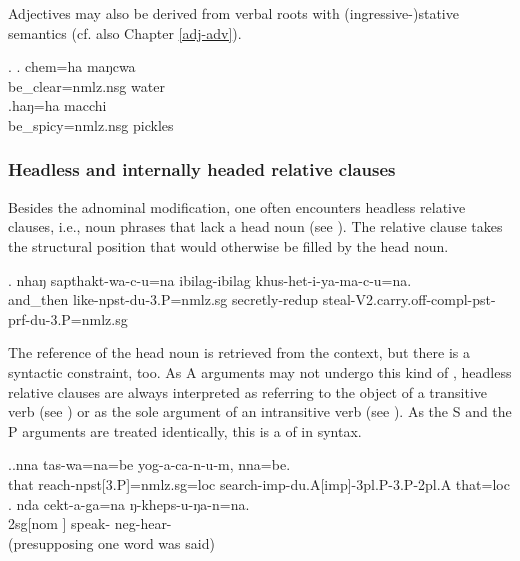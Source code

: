 Adjectives may also be derived from verbal roots with (ingressive-)stative semantics \Next (cf. also Chapter \ref{adj-adv}).


	  \ex. \ag.  chem=ha maŋcwa\\
	be\_clear{\sc =nmlz.nsg}  water\\
	\bg.haŋ=ha macchi\\
	be\_spicy{\sc =nmlz.nsg}	pickles\\

	
 

\subsubsection{Headless and internally headed relative clauses}\label{internally-headed-rc}
	
Besides the adnominal modification, one often encounters headless relative clauses, i.e., noun phrases that lack a head noun (see \Next). The relative clause takes the structural position that would otherwise be filled by the head noun.

\exg.  nhaŋ   sapthakt-wa-c-u=na                ibilag-ibilag       khus-het-i-ya-ma-c-u=na.\\
 and\_then like{\sc -npst-du-3.P=nmlz.sg} secretly-{\sc redup} steal{\sc -V2.carry.off-compl-pst-prf-du-3.P=nmlz.sg}\\
 


The reference of the head noun is retrieved from the context, but there is a syntactic constraint, too.
As A arguments may not undergo this kind of , headless relative clauses are always interpreted as referring to the object of a transitive verb (see \Next[a]) or as the sole argument of an intransitive verb (see \Next[b]). As the S and the P arguments are treated identically, this is a  of   in syntax.

\ex.\ag.nna  tas-wa=na=be  yog-a-ca-n-u-m, nna=be.\\
	that reach{\sc [3sg.A]-npst[3.P]=nmlz.sg=loc} search{\sc -imp-du.A[imp]-3pl.P-3.P-2pl.A}	that{\sc =loc}	\\
	\bg. nda  cekt-a-ga=na ŋ-kheps-u-ŋa-n=na.\\
{\sc 2sg[nom ]} speak- {\sc neg}-hear-\\
  (presupposing one word was said)


